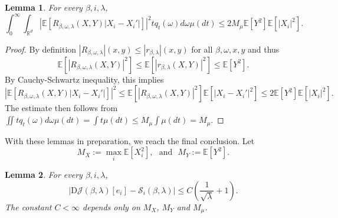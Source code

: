 \documentclass[sn-mathphys-num]{sn-jnl}%
\numberwithin{equation}{section}
\newcommand{\R}{\mathbb{R}}
\newcommand{\E}{\mathbb{E}}
\newtheorem{lemma}{Lemma}
\theoremstyle{thmstyleone}%
\theoremstyle{thmstyletwo}%
\theoremstyle{thmstylethree}%
\begin{document}
\begin{lemma}
\label{lemma:residual-bound-two}
For every $\beta, i, \lambda$, 
\begin{equation*}
	\int_0^\infty \int_{\R^d} |\E[R_{\beta, \omega, \lambda}(X, Y)|X_i - X_i'|] |^2 t q_t(\omega) d\omega \mu(dt) 
		\le 2 M_\mu\E[Y^2] \E[|X_i|^2]. 
\end{equation*}
\end{lemma}
\begin{proof}
By definition $|R_{\beta, \omega, \lambda}|(x, y) \le |r_{\beta, \lambda}|(x, y)$ for all $\beta, \omega, x, y$ and thus
\begin{equation*}
	\E[|R_{\beta, \omega, \lambda}(X, Y)|^2] \le \E[|r_{\beta, \lambda}(X, Y)|^2] \le \E[Y^2]. 
\end{equation*}
By Cauchy-Schwartz inequality, this implies 
\begin{equation*}
	 |\E[R_{\beta, \omega, \lambda}(X, Y)|X_i - X_i'|] |^2 \le \E[|R_{\beta, \omega, \lambda}(X, Y)|^2] \E[|X_i - X_i'|^2]
	 	\le 2\E[Y^2] \E[|X_i|^2].
\end{equation*} 
The estimate then follows from $\iint tq_t(\omega) d\omega \mu(dt) = \int t \mu(dt) \le M_\mu \int \mu(dt) = M_\mu$. 
\end{proof} 

With these lemmas in preparation, we reach the final conclusion. Let 
\begin{equation*}
	M_X:= \max_i \E[X_i^2],~~~\text{and}~~~M_Y:=\E[Y^2].
\end{equation*}
\begin{lemma}
\label{lemma:error-term}
For every $\beta, i, \lambda$, 
\begin{equation*}
	|\mathrm{D}\mathcal{J}(\beta, \lambda)[e_i] - \mathcal{S}_i(\beta, \lambda)| \le C(\frac{1}{\sqrt{\lambda}} + 1).
\end{equation*}
The constant $C  < \infty$ depends only on $M_X$, $M_Y$ and $M_\mu$. 
\end{lemma} 
\end{document}
